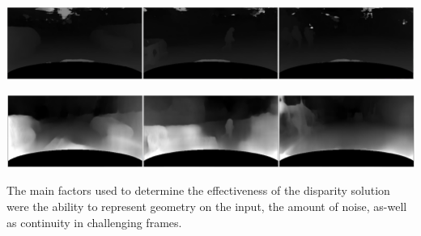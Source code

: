 \documentclass{article}
\begin{document}
	\begin{minipage}{1.0\linewidth}
		\begin{center}
			\includegraphics[width=1.0\linewidth]{"../_submission/disparity_PSMNet.png"}
		\end{center}
	\end{minipage}


	\begin{minipage}{1.0\linewidth}
		\begin{center}
			\includegraphics[width=1.0\linewidth]{"../_submission/disparity_mono-net.png"}
		\end{center}
	\end{minipage}

	The main factors used to determine the effectiveness of the disparity solution were the ability to represent geometry on the input, the amount of noise, as-well as continuity in challenging frames.
	
\end{document}
